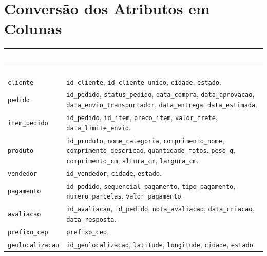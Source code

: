 \documentclass[12pt,a4paper]{article}
\begin{document}
	\section{Conversão dos Atributos em Colunas}
	{\small
		\renewcommand{\arraystretch}{1.35}
		\begin{longtable}{|>{\raggedright\arraybackslash}p{3.1cm}|>{\raggedright\arraybackslash}p{11.3cm}|}
			\hline
			\rowcolor{AzulCorporativo}
			\textcolor{white}{\textbf{Tabela}} & \textcolor{white}{\textbf{Colunas provenientes do modelo conceitual}} \\ \hline
			\endfirsthead
			\hline
			\rowcolor{AzulCorporativo}
			\textcolor{white}{\textbf{Tabela}} & \textcolor{white}{\textbf{Colunas provenientes do modelo conceitual}} \\ \hline
			\endhead
			\texttt{cliente} & \texttt{id\_cliente}, \texttt{id\_cliente\_unico}, \texttt{cidade}, \texttt{estado}. \\ \hline
			\texttt{pedido} & \texttt{id\_pedido}, \texttt{status\_pedido}, \texttt{data\_compra}, \texttt{data\_aprovacao}, \texttt{data\_envio\_transportador}, \texttt{data\_entrega}, \texttt{data\_estimada}. \\ \hline
			\texttt{item\_pedido} & \texttt{id\_pedido}, \texttt{id\_item}, \texttt{preco\_item}, \texttt{valor\_frete}, \texttt{data\_limite\_envio}. \\ \hline
			\texttt{produto} & \texttt{id\_produto}, \texttt{nome\_categoria}, \texttt{comprimento\_nome}, \texttt{comprimento\_descricao}, \texttt{quantidade\_fotos}, \texttt{peso\_g}, \texttt{comprimento\_cm}, \texttt{altura\_cm}, \texttt{largura\_cm}. \\ \hline
			\texttt{vendedor} & \texttt{id\_vendedor}, \texttt{cidade}, \texttt{estado}. \\ \hline
			\texttt{pagamento} & \texttt{id\_pedido}, \texttt{sequencial\_pagamento}, \texttt{tipo\_pagamento}, \texttt{numero\_parcelas}, \texttt{valor\_pagamento}. \\ \hline
			\texttt{avaliacao} & \texttt{id\_avaliacao}, \texttt{id\_pedido}, \texttt{nota\_avaliacao}, \texttt{data\_criacao}, \texttt{data\_resposta}. \\ \hline
			\texttt{prefixo\_cep} & \texttt{prefixo\_cep}. \\ \hline
			\texttt{geolocalizacao} & \texttt{id\_geolocalizacao}, \texttt{latitude}, \texttt{longitude}, \texttt{cidade}, \texttt{estado}. \\ \hline
	\end{longtable}}
\end{document}
